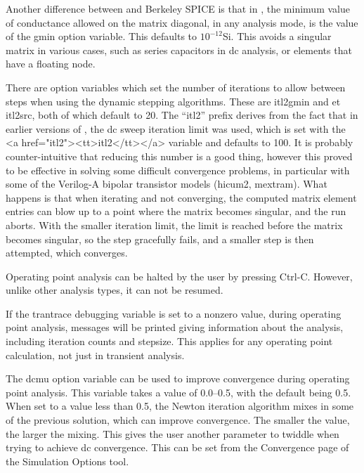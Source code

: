 Another difference between {\WRspice} and Berkeley SPICE is that in
{\WRspice}, the minimum value of conductance allowed on the matrix
diagonal, in any analysis mode, is the value of the {\et gmin} option
variable.  This defaults to $10^{-12}$Si.  This avoids a singular matrix
in various cases, such as series capacitors in dc analysis, or
elements that have a floating node.

There are option variables which set the number of iterations to
allow between steps when using the dynamic stepping algorithms. 
These are {\et itl2gmin} and {et itl2src}, both of which default to
20.  The ``{\et itl2}'' prefix derives from the fact that in earlier
versions of {\WRspice}, the dc sweep iteration limit was used, which
is set with the <a href="itl2"><tt>itl2</tt></a> variable and
defaults to 100.  It is probably counter-intuitive that reducing this
number is a good thing, however this proved to be effective in
solving some difficult convergence problems, in particular with some
of the Verilog-A bipolar transistor models (hicum2, mextram).  What
happens is that when iterating and not converging, the computed
matrix element entries can blow up to a point where the matrix
becomes singular, and the run aborts.  With the smaller iteration
limit, the limit is reached before the matrix becomes singular, so
the step gracefully fails, and a smaller step is then attempted,
which converges.

Operating point analysis can be halted by the user by pressing {\kb
Ctrl-C}.  However, unlike other analysis types, it can not be resumed.

If the {\et trantrace} debugging variable is set to a nonzero value,
during operating point analysis, messages will be printed giving
information about the analysis, including iteration counts and
stepsize.  This applies for any operating point calculation, not just
in transient analysis.

The {\et dcmu} option variable can be used to improve convergence
during operating point analysis.  This variable takes a value of
0.0--0.5, with the default being 0.5.  When set to a value less than
0.5, the Newton iteration algorithm mixes in some of the previous
solution, which can improve convergence.  The smaller the value, the
larger the mixing.  This gives the user another parameter to twiddle
when trying to achieve dc convergence.  This can be set from the {\cb
Convergence} page of the {\cb Simulation Options} tool.


